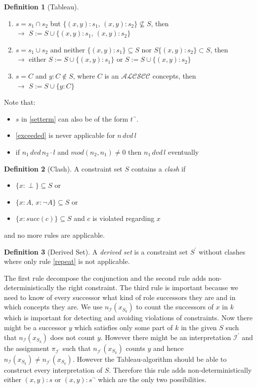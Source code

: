 \documentclass[a4paper,11pt]{scrartcl}
\theoremstyle{break}
\theoremstyle{definition}
\newtheorem{mydef}{Definition}
\begin{document}
\begin{mydef}[Tableau]
\begin{enumerate}
\begin{enumerate}
\item\label{setterm1} $s=s_1\cap s_2$ but $\{(x,y):s_1,\,(x,y):s_2\}\not\subseteq S$, then\\
$\rightarrow$ $S:=S\cup \{(x,y):s_1,\,(x,y):s_2\}$ 
\item\label{setterm2} $s=s_1\cup s_2$ and neither $\{(x,y):s_1\}\subseteq S$ nor $S\{(x,y):s_2\}\subset S$, then\\
$\rightarrow$ either $S:=S\cup \{(x,y):s_1\}$ or $S:=S\cup \{(x,y):s_2\}$ 
\item\label{setterm3} $s=C$ and $y:C\notin S$, where $C$ is an $\mathcal{ALCSCC}$ concepts, then \\
$\rightarrow$ $S:=S\cup\{y:C\}$
\end{enumerate}
\end{enumerate}
\end{mydef}
Note that:
\begin{itemize}
\item $s$ in \ref{setterm} can also be of the form $t^\neg$.
\item \ref{exceeded} is never applicable for $n\, dvd\, l$
\item if  $n_1\,dvd\,n_2\cdot l$ and $mod(n_2,n_1)\neq 0$ then $n_1\,dvd\,l$ eventually
\end{itemize}
\begin{mydef}[Clash]
A constraint set $S$ contains a \textit{clash} if
\begin{itemize}
\item $\{x:\perp\}\subseteq S$ or
\item $\{x:A,\,x:\neg A\}\subseteq S$ or
\item $\{x:succ(c)\}\subseteq S$ and $c$ is violated regarding $x$
\end{itemize}
and no more rules are applicable.
\end{mydef}
\begin{mydef}[Derived Set]
A \textit{derived set} is a constraint set $S^\prime$ without clashes where only rule \ref{repeat} is not applicable.
\end{mydef}
The first rule decompose the conjunction and the second rule adds non-deterministically the right constraint. The third rule is important because we need to know of every successor what kind of role successors they are and in which concepts they are. We use $n_\mathcal{I}(x_{S_k})$ to count the successors of $x$ in $k$ which is important for detecting and avoiding violations of constraints. Now there might be a successor $y$ which satisfies only some part of $k$ in the given $S$ such that $n_\mathcal{I}(x_{S_k})$ does not count $y$. However there might be an interpretation $\mathcal{I^\prime}$ and the assignment $\pi_\mathcal{I^\prime}$ such that $n_{\mathcal{I}^\prime}(x_{S_k})$ counts $y$ and hence $n_{\mathcal{I}}(x_{S_k})\neq n_{\mathcal{I}^\prime}(x_{S_k})$. However the Tableau-algorithm should be able to construct every interpretation of $S$. Therefore this rule adds non-deterministically either $(x,y):s$ or $(x,y):s^\neg$ which are the only two possibilities.\\ 
\end{document}
